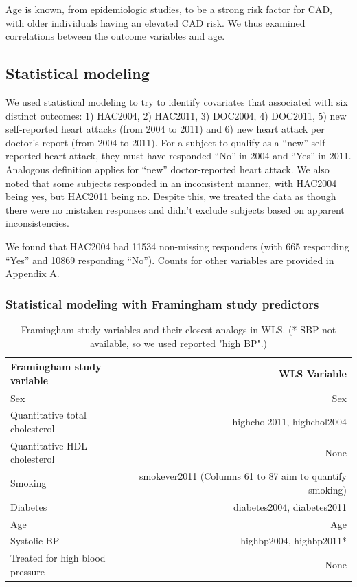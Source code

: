 \documentclass[11pt,]{article}
\begin{document}
Age is known, from epidemiologic studies, to be a strong risk factor for
CAD, with older individuals having an elevated CAD risk. We thus
examined correlations between the outcome variables and age.


\subsection{Statistical modeling}\label{statistical-modeling}

We used statistical modeling to try to identify covariates that
associated with six distinct outcomes: 1) HAC2004, 2) HAC2011, 3)
DOC2004, 4) DOC2011, 5) new self-reported heart attacks (from 2004 to
2011) and 6) new heart attack per doctor's report (from 2004 to 2011).
For a subject to qualify as a ``new'' self-reported heart attack, they
must have responded ``No'' in 2004 and ``Yes'' in 2011. Analogous
definition applies for ``new'' doctor-reported heart attack. We also
noted that some subjects responded in an inconsistent manner, with
HAC2004 being yes, but HAC2011 being no. Despite this, we treated the
data as though there were no mistaken responses and didn't exclude
subjects based on apparent inconsistencies.

We found that HAC2004 had 11534 non-missing responders (with 665
responding ``Yes'' and 10869 responding ``No''). Counts for other
variables are provided in Appendix A.

\subsubsection{Statistical modeling with Framingham study
predictors}\label{statistical-modeling-with-framingham-study-predictors}

\begin{table}
\begin{tabular}{l r}
Framingham study variable & WLS Variable\\
\hline
Sex & Sex\\
Quantitative total cholesterol & highchol2011, highchol2004\\
Quantitative HDL cholesterol & None\\
Smoking & smokever2011 (Columns 61 to 87 aim to quantify smoking) \\
Diabetes & diabetes2004, diabetes2011\\
Age & Age\\
Systolic BP & highbp2004, highbp2011* \\
Treated for high blood pressure & None\\
\hline
\end{tabular}
\caption{Framingham study variables and their closest analogs in WLS. (* SBP not available, so we used reported "high BP".)}
\label{tab:fram2wls}
\end{table}
\end{document}
